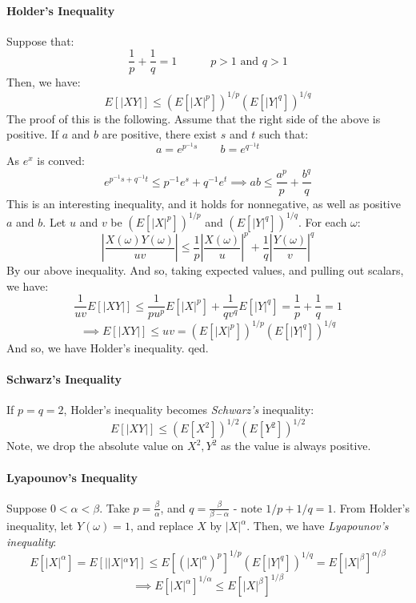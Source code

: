 \documentclass[12pt,a4paper]{article}
\newcommand{\1}[1]{\mathbbm{1}\left\{ #1 \right\}}
\begin{document}
\paragraph{Holder's Inequality} Suppose that:
$$
	\frac{1}{p} + \frac{1}{q} = 1 \quad\quad\quad p > 1 \text{ and } q > 1
$$
Then, we have:
$$
	E[|XY|] \leq \left(E[|X|^p]\right)^{1/p}\left(E[|Y|^q]\right)^{1/q}
$$
The proof of this is the following. Assume that the right side of the above is positive. If $a$ and $b$ are positive, there exist $s$ and $t$ such that:
$$
	a = e^{p^{-1}s} \quad\quad b = e^{q^{-1}t}
$$
As $e^x$ is conved:
$$
	e^{p^{-1}s + q^{-1}t} \leq p^{-1}e^s + q^{-1}e^t \implies
	ab \leq \frac{a^p}{p} + \frac{b^q}{q}
$$
This is an interesting inequality, and it holds for nonnegative, as well as positive $a$ and $b$. Let $u$ and $v$ be $\left(E[|X|^p]\right)^{1/p}$ and $\left(E[|Y|^q]\right)^{1/q}$. For each $\omega$:
$$
	\left|\frac{X(\omega)Y(\omega)}{uv}\right| \leq \frac{1}{p}\left|\frac{X(\omega)}{u}\right|^p + \frac{1}{q}\left|\frac{Y(\omega)}{v}\right|^q
$$
By our above inequality. And so, taking expected values, and pulling out scalars, we have:
$$
	\frac{1}{uv}E[|XY|] \leq \frac{1}{pu^p}E[|X|^p] + \frac{1}{qv^q}E[|Y|^q] =
	\frac{1}{p} + \frac{1}{q} = 1
$$
$$
	\implies E[|XY|] \leq uv = \left(E[|X|^p]\right)^{1/p}\left(E[|Y|^q]\right)^{1/q}
$$
And so, we have Holder's inequality. qed.

\paragraph{Schwarz's Inequality} If $p = q = 2$, Holder's inequality becomes \textit{Schwarz's} inequality:
$$
	E[|XY|] \leq \left(E[X^2]\right)^{1/2}\left(E[Y^2]\right)^{1/2}
$$
Note, we drop the absolute value on $X^2,Y^2$ as the value is always positive.

\paragraph{Lyapounov's Inequality} Suppose $0 < \alpha < \beta$. Take $p = \frac{\beta}{\alpha}$, and $q = \frac{\beta}{\beta - \alpha}$ - note $1/p + 1/q = 1$. From Holder's inequality, let $Y(\omega) = 1$, and replace $X$ by $|X|^\alpha$. Then, we have \textit{Lyapounov's inequality}:
$$
	E[|X|^\alpha] = E[||X|^\alpha Y|] \leq
	E\left[\left(|X|^\alpha\right)^p\right]^{1/p}\left(E[|Y|^q]\right)^{1/q} =
	E\left[|X|^\beta\right]^{\alpha/\beta}
$$
$$
	\implies
	E[|X|^\alpha]^{1/\alpha} \leq E\left[|X|^\beta\right]^{1/\beta}
$$
\end{document}

